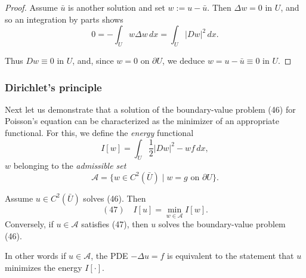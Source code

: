 \begin{proof}
Assume $\bar{u}$ is another solution and set $w := u - \bar{u}$. Then $\Delta w = 0$ in $U$, and so an integration by parts shows
$$0 = -\int_U w\Delta w \, dx = \int_U |Dw|^2 \, dx.$$

Thus $Dw \equiv 0$ in $U$, and, since $w = 0$ on $\partial U$, we deduce $w = u - \bar{u} \equiv 0$ in $U$.
\end{proof}

\subsubsection{Dirichlet's principle}
\label{sec:laplace-dirichlets-principle}

Next let us demonstrate that a solution of the boundary-value problem (46) for Poisson's equation can be characterized as the minimizer of an appropriate functional. For this, we define the \textit{energy} functional
$$I[w] = \int_U \frac{1}{2}|Dw|^2 - wf \, dx,$$
$w$ belonging to the \textit{admissible set}
$$\mathcal{A} = \{w \in C^2(\bar{U}) \mid w = g \text{ on } \partial U\}.$$

\begin{theorem}
\label{thm:dirichlets-principle}
Assume $u \in C^2(\bar{U})$ solves (46). Then
$$(47) \quad I[u] = \min_{w \in \mathcal{A}} I[w].$$
Conversely, if $u \in \mathcal{A}$ satisfies (47), then $u$ solves the boundary-value problem (46).
\end{theorem}

In other words if $u \in \mathcal{A}$, the PDE $-\Delta u = f$ is equivalent to the statement that $u$ minimizes the energy $I[\cdot]$.

